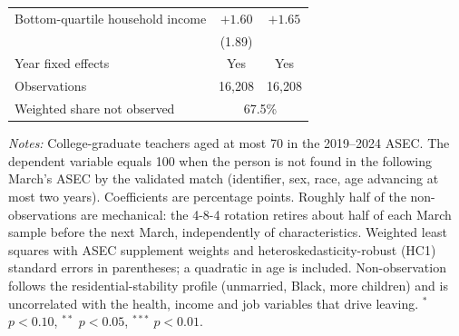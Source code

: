 \documentclass[11pt]{article}
\newcommand{\sym}[1]{\rlap{$^{#1}$}}
\begin{document}
\begin{center}
\begin{threeparttable}
\begin{tabular}{lcc}
Bottom-quartile household income & $+1.60$\sym{} & $+1.65$ \\
 & (1.89) & \\[0.2em]
\midrule
Year fixed effects & Yes & Yes \\
Observations       & 16,208 & 16,208 \\
Weighted share not observed & \multicolumn{2}{c}{67.5\%} \\
\bottomrule
\end{tabular}
\begin{tablenotes}[flushleft]
\footnotesize
\item \emph{Notes:} College-graduate teachers aged at most 70 in the
2019--2024 ASEC. The dependent variable equals 100 when the person is
not found in the following March's ASEC by the validated match
(identifier, sex, race, age advancing at most two years). Coefficients
are percentage points. Roughly half of the non-observations are
mechanical: the 4-8-4 rotation retires about half of each March sample
before the next March, independently of characteristics. Weighted
least squares with ASEC supplement weights and heteroskedasticity-robust
(HC1) standard errors in parentheses; a quadratic in age is included.
Non-observation follows the residential-stability profile (unmarried,
Black, more children) and is uncorrelated with the health, income and
job variables that drive leaving.
$^{*}$ $p<0.10$, $^{**}$ $p<0.05$, $^{***}$ $p<0.01$.
\end{tablenotes}
\end{threeparttable}
\end{center}
\end{document}
